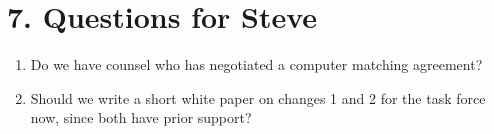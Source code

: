 \documentclass[letterpaper,11pt]{article}
\providecommand{\tightlist}{\setlength{\itemsep}{0pt}\setlength{\parskip}{0pt}}
\begin{document}
\hypertarget{questions-for-steve}{%
\section*{7. Questions for Steve}\label{questions-for-steve}}

\begin{enumerate}
\def\labelenumi{\arabic{enumi}.}
\tightlist
\item
  Do we have counsel who has negotiated a computer matching agreement?
\item
  Should we write a short white paper on changes 1 and 2 for the task
  force now, since both have prior support?
\end{enumerate}
\end{document}
